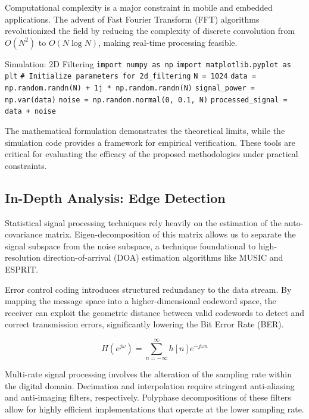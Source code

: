 Computational complexity is a major constraint in mobile and embedded applications. The advent of Fast Fourier Transform (FFT) algorithms revolutionized the field by reducing the complexity of discrete convolution from $O(N^2)$ to $O(N \log N)$, making real-time processing feasible.

\begin{pythonbox}{Simulation: 2D Filtering}
\texttt{import numpy as np}
\texttt{import matplotlib.pyplot as plt}
\texttt{}
\texttt{\# Initialize parameters for 2d\_filtering}
\texttt{N = 1024}
\texttt{data = np.random.randn(N) + 1j * np.random.randn(N)}
\texttt{signal\_power = np.var(data)}
\texttt{noise = np.random.normal(0, 0.1, N)}
\texttt{processed\_signal = data + noise}
\end{pythonbox}

\vspace{0.5cm}
The mathematical formulation demonstrates the theoretical limits, while the simulation code provides a framework for empirical verification. These tools are critical for evaluating the efficacy of the proposed methodologies under practical constraints.


\subsection{In-Depth Analysis: Edge Detection}
Statistical signal processing techniques rely heavily on the estimation of the auto-covariance matrix. Eigen-decomposition of this matrix allows us to separate the signal subspace from the noise subspace, a technique foundational to high-resolution direction-of-arrival (DOA) estimation algorithms like MUSIC and ESPRIT.

Error control coding introduces structured redundancy to the data stream. By mapping the message space into a higher-dimensional codeword space, the receiver can exploit the geometric distance between valid codewords to detect and correct transmission errors, significantly lowering the Bit Error Rate (BER).

\begin{equation}
    H(e^{j\omega}) = \sum_{n=-\infty}^{\infty} h[n] e^{-j\omega n}
\end{equation}

Multi-rate signal processing involves the alteration of the sampling rate within the digital domain. Decimation and interpolation require stringent anti-aliasing and anti-imaging filters, respectively. Polyphase decompositions of these filters allow for highly efficient implementations that operate at the lower sampling rate.

